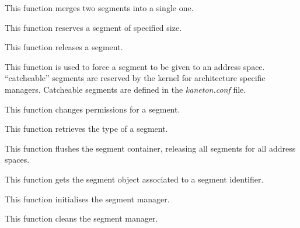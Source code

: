 This function merges two segments into a single one.


This function reserves a segment of specified size.


This function releases a segment.


This function  is used to  force a segment  to be given to  an address
space.  ``catcheable''  segments  are   reserved  by  the  kernel  for
architecture specific managers. Catcheable segments are defined in the
\textit{kaneton.conf} file.


This function changes permissions for a segment.


This function retrieves the type of a segment.


This function  flushes the  segment container, releasing  all segments
for all address spaces.


This  function  gets  the  segment  object  associated  to  a  segment
identifier.


This function initialises the segment manager.


This function cleans the segment manager.

